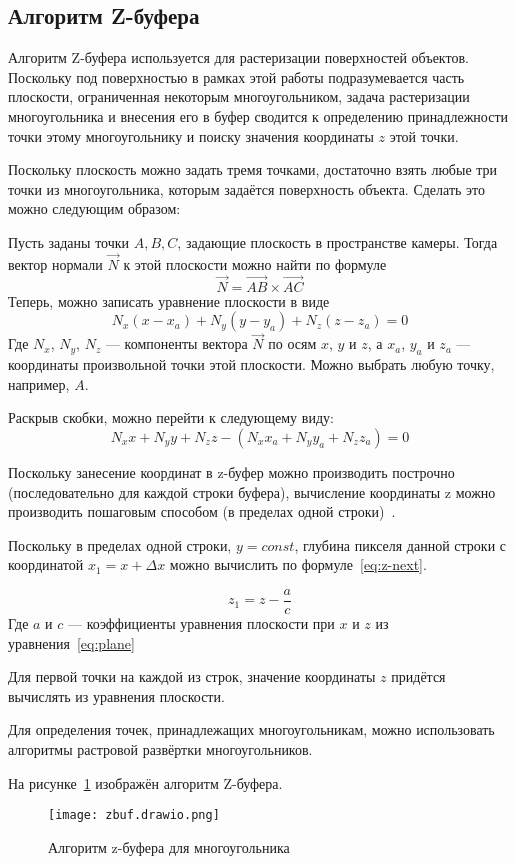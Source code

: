 \subsection{Алгоритм Z-буфера}

Алгоритм Z-буфера используется для растеризации поверхностей объектов. Поскольку под поверхностью в рамках этой работы подразумевается часть плоскости, ограниченная некоторым многоугольником, задача растеризации многоугольника и внесения его в буфер сводится к определению принадлежности точки этому многоугольнику и поиску значения координаты $z$ этой точки.

Поскольку плоскость можно задать тремя точками, достаточно взять любые три точки из многоугольника, которым задаётся поверхность объекта. Сделать это можно следующим образом:

Пусть заданы точки $A, B, C$, задающие плоскость в пространстве камеры. Тогда вектор нормали $\vec{N}$ к этой плоскости можно найти по формуле
$$ \vec{N} = \vec{AB} \times \vec{AC} $$
Теперь, можно записать уравнение плоскости в виде
$$ N_x(x-x_a) + N_y(y-y_a) + N_z(z-z_a) = 0 $$
Где $N_x$, $N_y$, $N_z$ --- компоненты вектора $\vec{N}$ по осям $x$, $y$ и $z$, а $x_a$, $y_a$ и $z_a$ --- координаты произвольной точки этой плоскости. Можно выбрать любую точку, например, $A$.

Раскрыв скобки, можно перейти к следующему виду:
\begin{equation}
    N_xx + N_yy + N_zz - (N_xx_a + N_yy_a + N_zz_a) = 0
    \label{eq:plane}
\end{equation}

Поскольку занесение координат в z-буфер можно производить построчно (последовательно для каждой строки буфера), вычисление координаты z можно производить пошаговым способом (в пределах одной строки)~\cite{Rogers}.

Поскольку в пределах одной строки, $y = const$, глубина пикселя данной строки с координатой $x_1 = x + \Delta x$ можно вычислить по формуле~\ref{eq:z-next}.

\begin{equation}
    z_1 = z - \frac{ a}{ c}
    \label{eq:z-next}
\end{equation}
Где $a$ и $c$ --- коэффициенты уравнения плоскости при $x$ и $z$ из уравнения~\ref{eq:plane}

Для первой точки на каждой из строк, значение координаты $z$ придётся вычислять из уравнения плоскости.

Для определения точек, принадлежащих многоугольникам, можно использовать алгоритмы растровой развёртки многоугольников.

На рисунке~\ref{fig:z-buffer} изображён алгоритм Z-буфера.

\begin{figure}[h!]
    \centering
    \texttt{[image: zbuf.drawio.png]}
    \caption{Алгоритм z-буфера для многоугольника}
    \label{fig:z-buffer}
\end{figure}
